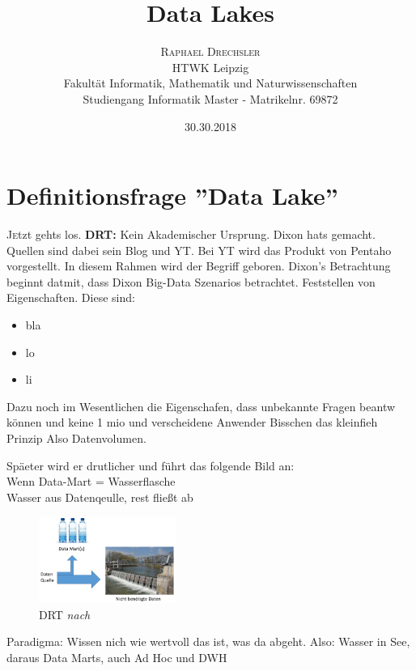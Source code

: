 \documentclass[twoside,twocolumn]{article}
\title{Data Lakes} %
\author{%
\textsc{Raphael Drechsler}\\[1ex] %
\normalsize HTWK Leipzig \\ 
\normalsize Fakultät Informatik, Mathematik und Naturwissenschaften\\ 
\normalsize Studiengang Informatik Master - Matrikelnr. 69872\\%
}
\date{30.30.2018} %
\begin{document}
\maketitle


\section{Definitionsfrage ''Data Lake''}
\lettrine[nindent=0em,lines=2]{J} etzt gehts los.
\textbf{DRT:}
Kein Akademischer Ursprung. Dixon hats gemacht. Quellen sind dabei sein Blog\cite{src5} und YT\cite{src6}. Bei YT wird das Produkt von Pentaho vorgestellt. In diesem Rahmen wird der Begriff geboren.
Dixon's Betrachtung beginnt datmit, dass Dixon Big-Data Szenarios betrachtet. Feststellen von Eigenschaften. Diese sind:
\begin{itemize}
	\item bla
	\item lo
	\item li
\end{itemize}

Dazu noch im Wesentlichen die Eigenschafen, dass unbekannte Fragen beantw können und keine 1 mio und verscheidene Anwender Bisschen das kleinfieh Prinzip
Also Datenvolumen.

Späeter wird er drutlicher und führt das folgende Bild an:\\
Wenn Data-Mart = Wasserflasche\\
Wasser aus Datenqeulle, rest fließt ab \\

\begin{figure}[h]
	\centering 
	\includegraphics[width=0.4\textwidth]{img/p1} 
	\caption[DRT]{DRT \textit{nach} \cite{src6}}	
\end{figure}

Paradigma: Wissen nich wie wertvoll das ist, was da abgeht.
Also: Wasser in See, daraus Data Marts, auch Ad Hoc und DWH\\
\end{document}
